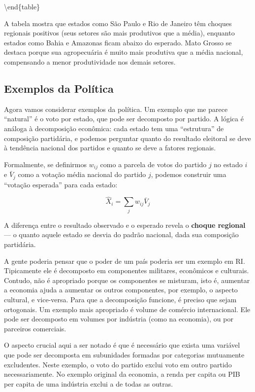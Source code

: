 \documentclass[
]{article}
\begin{document}
\textbackslash end\{table\}

A tabela mostra que estados como São Paulo e Rio de Janeiro têm choques regionais positivos (seus setores são mais produtivos que a média), enquanto estados como Bahia e Amazonas ficam abaixo do esperado. Mato Grosso se destaca porque sua agropecuária é muito mais produtiva que a média nacional, compensando a menor produtividade nos demais setores.

\subsection{Exemplos da Política}\label{exemplos-da-poluxedtica}

Agora vamos considerar exemplos da política. Um exemplo que me parece ``natural'' é o voto por estado, que pode ser decomposto por partido. A lógica é análoga à decomposição econômica: cada estado tem uma ``estrutura'' de composição partidária, e podemos perguntar quanto do resultado eleitoral se deve à tendência nacional dos partidos e quanto se deve a fatores regionais.

Formalmente, se definirmos \(w_{ij}\) como a parcela de votos do partido \(j\) no estado \(i\) e \(\bar{V}_j\) como a votação média nacional do partido \(j\), podemos construir uma ``votação esperada'' para cada estado:

\begin{equation}
\hat{X}_i = \sum_j w_{ij}\bar{V}_{j}
\label{eq:voto-esperado}
\end{equation}

A diferença entre o resultado observado e o esperado revela o \textbf{choque regional} --- o quanto aquele estado se desvia do padrão nacional, dada sua composição partidária.

A gente poderia pensar que o poder de um país poderia ser um exemplo em RI. Tipicamente ele é decomposto em componentes militares, econômicos e culturais. Contudo, não é apropriado porque os componentes se misturam, isto é, aumentar a economia ajuda a aumentar os outros componentes, por exemplo, o aspecto cultural, e vice-versa. Para que a decomposição funcione, é preciso que sejam ortogonais. Um exemplo mais apropriado é volume de comércio internacional. Ele pode ser decomposto em volumes por indústria (como na economia), ou por parceiros comerciais.

O aspecto crucial aqui a ser notado é que é necessário que exista uma variável que pode ser decomposta em subunidades formadas por categorias mutuamente excludentes. Neste exemplo, o voto do partido exclui voto em outro partido necessariamente. No exemplo original da economia, a renda per capita ou PIB per capita de uma indústria exclui a de todas as outras.
\end{document}
